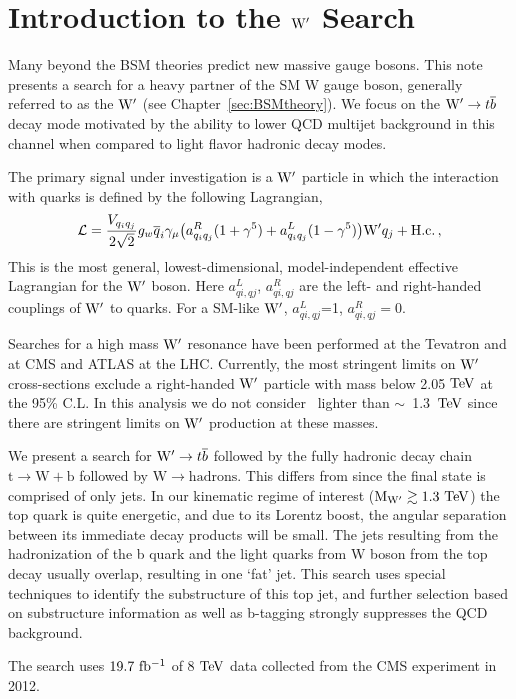 
\chapter{Introduction to the $\mathrm{W}^\prime$ Search}

\label{sec:introduction}

Many beyond the BSM theories predict new massive
gauge bosons.  This note presents a search for a heavy partner of
the SM W gauge boson, generally referred to as the
$\mathrm{W}^\prime$ (see Chapter~\ref{sec:BSMtheory}).  
We focus on the $\mathrm{W}^\prime \to {t\overline{b}}$ decay mode motivated by the ability to lower QCD multijet background in this channel when compared to light flavor hadronic decay modes. 


The primary signal under investigation is a $\mathrm{W}^\prime$ particle in which the interaction with quarks 
is defined by the following Lagrangian,
\begin{eqnarray}
{\cal L} = \frac{V_{q_iq_j}}{2\sqrt{2}} g_w \overline{q}_i\gamma_\mu 
\bigl( a^R_{q_iq_j} (1+{\gamma}^5) + a^L_{q_iq_j}
(1-{\gamma}^5)\bigr) {\wpr} q_j + \mathrm{H.c.} \,,
\label{eqn:Lag}
\end{eqnarray}
This is the most general, lowest-dimensional, model-independent
effective Lagrangian for the $\mathrm{W}^\prime$ boson.  Here $a_{qi,qj}^{L}$,
$a_{qi,qj}^{R}$ are the left- and right-handed couplings of $\mathrm{W}^\prime$ to quarks.
For a SM-like $\mathrm{W}^\prime$, $a_{qi,qj}^{L}$=1, $a_{qi,qj}^{R}=0$.


Searches for a high mass $\mathrm{W}^\prime$ resonance have been performed at the
Tevatron \cite{PhysRevLett.100.211803,Abazov2011145} and at CMS \cite{CMS-PAS-B2G-12-010,CMS-PAS-EXO-12-060,CMS-PAS-EXO-12-025} and ATLAS \cite{PhysRevLett.109.081801} at the LHC.  
Currently, the most stringent limits on $\mathrm{W}^\prime$ cross-sections exclude a right-handed $\mathrm{W}^\prime$ particle with mass below 2.05$~\mathrm{TeV}$ at the 95\% C.L. In this analysis we do not consider \wpr\
  lighter than $\sim$~1.3~$\mathrm{TeV}$ since there are stringent limits on $\mathrm{W}^\prime$ production at these masses.  

We present a search for $\mathrm{W}^\prime \to {t\overline{b}}$ followed by the
fully hadronic decay chain $\mathrm{t \to W+b}$ followed by $\mathrm{W \to hadrons}$.
This differs from \cite{CMS-PAS-B2G-12-010} since the final state is
comprised of only jets.  In our kinematic regime of interest ($\mathrm{M_{\mathrm{W}^\prime}
\gtrsim 1.3~\mathrm{TeV}}$) the top quark is quite energetic, and due to its Lorentz
boost, the angular separation between its immediate decay products will
be small.  The jets resulting from the hadronization of the b quark
and the light quarks from W boson from the top decay usually overlap, resulting in one
`fat' jet.  This search uses special techniques to identify the
substructure of this top jet, and further selection based on
substructure information as well as b-tagging strongly suppresses the
QCD background.

The search uses $19.7~\mathrm{fb^{-1}}$ of 8$~\mathrm{TeV}$ data collected from
the CMS experiment in 2012.
